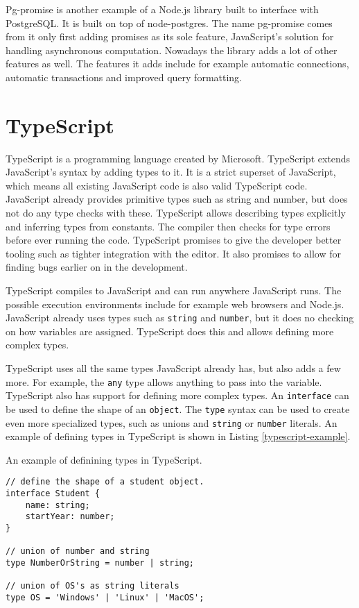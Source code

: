 Pg-promise is another example of a Node.js library built to interface with PostgreSQL.
It is built on top of node-postgres.
The name pg-promise comes from it only first adding promises as its sole feature, JavaScript's solution for handling asynchronous computation.
Nowadays the library adds a lot of other features as well.
The features it adds include for example automatic connections, automatic transactions and improved query formatting.
\cite{pg-promise}

\section{TypeScript}

TypeScript is a programming language created by Microsoft.
TypeScript extends JavaScript's syntax by adding types to it.
It is a strict superset of JavaScript, which means all existing JavaScript code is also valid TypeScript code.
JavaScript already provides primitive types such as string and number, but does not do any type checks with these.
TypeScript allows describing types explicitly and inferring types from constants.
The compiler then checks for type errors before ever running the code.
TypeScript promises to give the developer better tooling such as tighter integration with the editor.
It also promises to allow for finding bugs earlier on in the development.
\cite{typescript}

TypeScript compiles to JavaScript and can run anywhere JavaScript runs. The possible execution environments include for example web browsers and Node.js.
JavaScript already uses types such as \texttt{string} and \texttt{number}, but it does no checking on how variables are assigned.
TypeScript does this and allows defining more complex types.
\cite{typescript}

TypeScript uses all the same types JavaScript already has, but also adds a few more.
For example, the \texttt{any} type allows anything to pass into the variable.
TypeScript also has support for defining more complex types.
An \texttt{interface} can be used to define the shape of an \texttt{object}.
The \texttt{type} syntax can be used to create even more specialized types, such as unions and \texttt{string} or \texttt{number} literals.
\cite{typescript}
An example of defining types in TypeScript is shown in Listing \ref{typescript-example}.

\begin{breakablealgorithm}
\caption{An example of definining types in TypeScript.}
\label{typescript-example}
\begin{verbatim}
// define the shape of a student object.
interface Student {
    name: string;
    startYear: number;
}

// union of number and string
type NumberOrString = number | string;

// union of OS's as string literals
type OS = 'Windows' | 'Linux' | 'MacOS';
\end{verbatim}
\end{breakablealgorithm}

